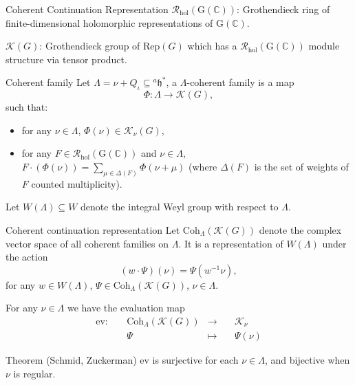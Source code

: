 \documentclass{beamer}
\newcommand{\BC}{{\mathbb {C}}}
\newcommand{\CK}{{\mathcal {K}}}
\newcommand{\CR}{{\mathcal {R}}}
\newcommand{\RG}{{\mathrm {G}}}
\newcommand{\fh}{\mathfrak{h}}
\newcommand{\Rep}{{\mathrm{Rep}}}
\newcommand{\defmap}[5]{
           \begin{equation*}
              \begin{aligned}
                   #1:\quad  & #2 &\longrightarrow &\quad #3 \\
                      \quad  & #4    &\longmapsto  &\quad #5
              \end{aligned}
           \end{equation*}
          }
\begin{document}
\begin{frame}{Coherent Continuation Representation}
  $\CR_{\mathrm{hol}}(\RG(\BC))$: Grothendieck ring of finite-dimensional holomorphic representations of $\RG(\BC)$.\par
  $\CK(G)$: Grothendieck group of $\Rep(G)$ which has a $\CR_{\mathrm{hol}}(\RG(\BC))$ module structure via tensor product.
  \begin{block}{Coherent family}
    Let $\Lambda = \nu + Q_{\iota} \subseteq {^{a}\fh}^*$, a $\Lambda$-coherent family is a map
   $$\Phi: \Lambda \to \CK(G),$$
   such that:
   \begin{itemize}
      \item for any $\nu \in \Lambda$, $\Phi(\nu) \in \CK_{\nu}(G)$,
      \item for any $F \in \CR_{\mathrm{hol}}(\RG(\BC))$ and $\nu \in \Lambda$, $F \cdot (\Phi(\nu)) = \sum_{\mu \in \Delta(F)} \Phi(\nu + \mu)$ (where $\Delta(F)$ is the set of weights of $F$ counted multiplicity).
   \end{itemize}
  \end{block}
\end{frame}






\begin{frame}
  Let $W(\Lambda) \subseteq W$ denote the integral Weyl group with respect to $\Lambda$.
  \begin{block}{Coherent continuation representation}
  Let $\mathrm{Coh}_{\Lambda}(\CK(G))$ denote the complex vector space of all coherent families on $\Lambda$. It is a representation of $W(\Lambda)$ under the action
  \[(w \cdot \Psi)(\nu) = \Psi(w^{-1}\nu),\]
  for any $w \in W(\Lambda)$, $\Psi \in \mathrm{Coh}_{\Lambda}(\CK(G))$, $\nu \in \Lambda$.
  \end{block}
    For any $\nu \in \Lambda$ we have the evaluation map \defmap{\mathrm{ev}}{\mathrm{Coh}_{\Lambda}(\CK(G))}{\CK_{\nu}}{\Psi}{\Psi(\nu)}
  \begin{block}{Theorem (Schmid, Zuckerman)}
    $\mathrm{ev}$ is surjective for each $\nu \in \Lambda$, and bijective when $\nu$ is regular.
  \end{block}

\end{frame}
\end{document}
